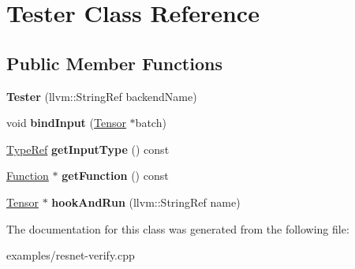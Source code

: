 \hypertarget{class_tester}{}\section{Tester Class Reference}
\label{class_tester}
\subsection*{Public Member Functions}
\begin{DoxyCompactItemize}
\item 
\mbox{\label{class_tester_a7c04c0364a29652651c4543fa433fa01}} 
{\bfseries Tester} (llvm\+::\+String\+Ref backend\+Name)
\item 
\mbox{\label{class_tester_af30fc018dafe78dc15227ab793c2ddb8}} 
void {\bfseries bind\+Input} (\hyperlink{classglow_1_1_tensor}{Tensor} $\ast$batch)
\item 
\mbox{\label{class_tester_a991eb7bcbe8a302b7302b5c2cec2ec8b}} 
\hyperlink{structglow_1_1_type}{Type\+Ref} {\bfseries get\+Input\+Type} () const
\item 
\mbox{\label{class_tester_a3907e6c4a17a806f0e39188b2e078e33}} 
\hyperlink{classglow_1_1_function}{Function} $\ast$ {\bfseries get\+Function} () const
\item 
\mbox{\label{class_tester_ac5e03d0d609aac4140d8bbaa0daa4f41}} 
\hyperlink{classglow_1_1_tensor}{Tensor} $\ast$ {\bfseries hook\+And\+Run} (llvm\+::\+String\+Ref name)
\end{DoxyCompactItemize}


The documentation for this class was generated from the following file\+:\begin{DoxyCompactItemize}
\item 
examples/resnet-\/verify.\+cpp\end{DoxyCompactItemize}
